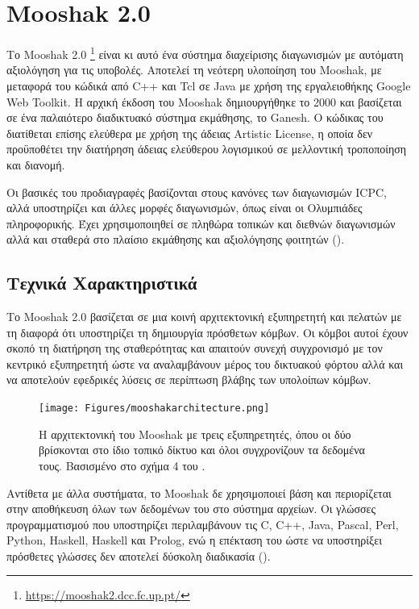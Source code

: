 \documentclass[diploma]{softlab-thesis}
\begin{document}
\FloatBarrier

\section{Mooshak 2.0}

Το Mooshak 2.0 \footnote{\url{https://mooshak2.dcc.fc.up.pt/}} είναι κι αυτό ένα
σύστημα διαχείρισης διαγωνισμών με αυτόματη αξιολόγηση για τις υποβολές.
Αποτελεί τη νεότερη υλοποίηση του Mooshak, με μεταφορά του κώδικά από C++ και
Tcl σε Java με χρήση της εργαλειοθήκης Google Web Toolkit. H αρχική έκδοση του
Mooshak δημιουργήθηκε το 2000 και βασίζεται σε ένα παλαιότερο διαδικτυακό
σύστημα εκμάθησης, το Ganesh. Ο κώδικας του διατίθεται επίσης ελεύθερα με χρήση
της άδειας Artistic License, η οποία δεν προϋποθέτει την διατήρηση άδειας
ελεύθερου λογισμικού σε μελλοντική τροποποίηση και διανομή.

\bigskip

Οι βασικές του προδιαγραφές βασίζονται στους κανόνες των διαγωνισμών ICPC, αλλά
υποστηρίζει και άλλες μορφές διαγωνισμών, όπως είναι οι Ολυμπιάδες πληροφορικής.
Έχει χρησιμοποιηθεί σε πληθώρα τοπικών και διεθνών διαγωνισμών αλλά και σταθερά
στο πλαίσιο εκμάθησης και αξιολόγησης φοιτητών (\cite{leal2008using}).

\subsection{Τεχνικά Χαρακτηριστικά}

Το Mooshak 2.0 βασίζεται σε μια κοινή αρχιτεκτονική εξυπηρετητή και πελατών με τη
διαφορά ότι υποστηρίζει τη δημιουργία πρόσθετων κόμβων. Οι κόμβοι αυτοί έχουν σκοπό
τη διατήρηση της σταθερότητας και απαιτούν συνεχή συγχρονισμό με τον κεντρικό
εξυπηρετητή ώστε να αναλαμβάνουν μέρος του δικτυακού φόρτου αλλά και να αποτελούν
εφεδρικές λύσεις σε περίπτωση βλάβης των υπολοίπων κόμβων.

\bigskip

\begin{figure}
  \centering
  \texttt{[image: Figures/mooshakarchitecture.png]}
  \caption[Η αρχιτεκτονική του Mooshak]{Η αρχιτεκτονική του Mooshak με τρεις
  εξυπηρετητές, όπου οι δύο βρίσκονται στο ίδιο τοπικό δίκτυο και όλοι
  συγχρονίζουν τα δεδομένα τους. Βασισμένο στο σχήμα 4 του
  \cite{leal2003mooshak}.}
\end{figure}

\bigskip

Αντίθετα με άλλα συστήματα, το Mooshak δε χρησιμοποιεί βάση και περιορίζεται
στην αποθήκευση όλων των δεδομένων του στο σύστημα αρχείων. Οι γλώσσες
προγραμματισμού που υποστηρίζει περιλαμβάνουν τις C, C++, Java, Pascal, Perl,
Python, Haskell, Haskell και Prolog, ενώ η επέκταση του ώστε να υποστηρίξει
πρόσθετες γλώσσες δεν αποτελεί δύσκολη διαδικασία (\cite{ribeiro2008early}).
\end{document}
